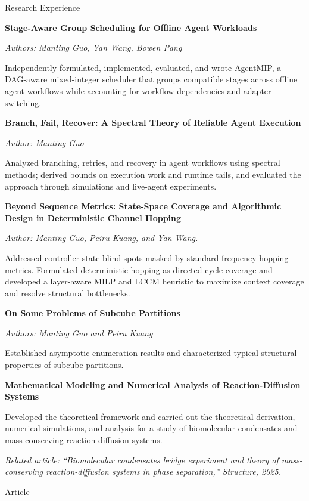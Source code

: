 \begin{rubric}{Research Experience}

\entry*[2025 -- 2026]%
  \textbf{Stage-Aware Group Scheduling for Offline Agent Workloads}
  \par \textit{Authors: Manting Guo, Yan Wang, Bowen Pang}
  \par Independently formulated, implemented, evaluated, and wrote AgentMIP, a DAG-aware mixed-integer scheduler that groups compatible stages across offline agent workflows while accounting for workflow dependencies and adapter switching.

\entry*[2025 -- 2026]%
  \textbf{Branch, Fail, Recover: A Spectral Theory of Reliable Agent Execution}
  \par \textit{Author: Manting Guo}
  \par Analyzed branching, retries, and recovery in agent workflows using spectral methods; derived bounds on execution work and runtime tails, and evaluated the approach through simulations and live-agent experiments.

\entry*[2024 -- 2025]%
  \textbf{Beyond Sequence Metrics: State-Space Coverage and Algorithmic Design in Deterministic Channel Hopping}
   \par \textit{Author:   Manting Guo, Peiru Kuang, and Yan Wang.}

  \par Addressed controller-state blind spots masked by standard frequency hopping metrics. Formulated deterministic hopping as directed-cycle coverage and developed a layer-aware MILP and LCCM heuristic to maximize context coverage and resolve structural bottlenecks.


\entry*[2024 -- 2026]%
  \textbf{On Some Problems of Subcube Partitions}
  \par \textit{Authors: Manting Guo and Peiru Kuang }
  \par Established asymptotic enumeration results and characterized typical structural properties of subcube partitions.


\entry*[2023 -- 2024]%
  \textbf{Mathematical Modeling and Numerical Analysis of Reaction-Diffusion Systems}
  \par Developed the theoretical framework and carried out the theoretical derivation, numerical simulations, and analysis for a study of biomolecular condensates and mass-conserving reaction-diffusion systems.
  \par \textit{Related article: ``Biomolecular condensates bridge experiment and theory of mass-conserving reaction-diffusion systems in phase separation,'' \emph{Structure}, 2025.}
  \par \href{https://www.cell.com/structure/fulltext/S0969-2126(25)00216-3}{Article}


\end{rubric}
